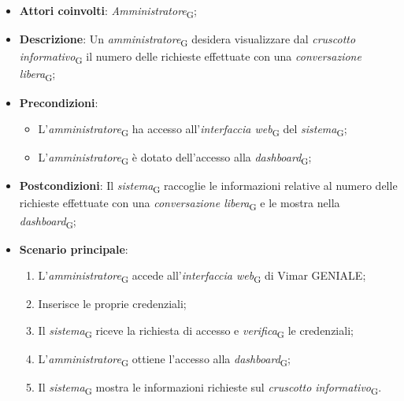 \begin{itemize}
    \item \textbf{Attori coinvolti}: \textit{Amministratore}\textsubscript{G};
    \item \textbf{Descrizione}: Un \textit{amministratore}\textsubscript{G} desidera visualizzare dal \textit{cruscotto informativo}\textsubscript{G} il numero delle richieste effettuate con una \textit{conversazione libera}\textsubscript{G};
    \item \textbf{Precondizioni}: 
        \begin{itemize}
            \item L’\textit{amministratore}\textsubscript{G} ha accesso all’\textit{interfaccia web}\textsubscript{G} del \textit{sistema}\textsubscript{G};
            \item L’\textit{amministratore}\textsubscript{G} è dotato dell’accesso alla \textit{dashboard}\textsubscript{G};
        \end{itemize}
    \item \textbf{Postcondizioni}: Il \textit{sistema}\textsubscript{G} raccoglie le informazioni relative al numero delle richieste effettuate con una \textit{conversazione libera}\textsubscript{G} e le mostra nella \textit{dashboard}\textsubscript{G};
    \item \textbf{Scenario principale}:
    \begin{enumerate}
    \item L’\textit{amministratore}\textsubscript{G} accede all’\textit{interfaccia web}\textsubscript{G} di Vimar GENIALE;
    \item Inserisce le proprie credenziali;
    \item Il \textit{sistema}\textsubscript{G} riceve la richiesta di accesso e \textit{verifica}\textsubscript{G} le credenziali;
    \item L’\textit{amministratore}\textsubscript{G} ottiene l’accesso alla \textit{dashboard}\textsubscript{G};
    \item Il \textit{sistema}\textsubscript{G} mostra le informazioni richieste sul \textit{cruscotto informativo}\textsubscript{G}.
    \end{enumerate}
\end{itemize}

